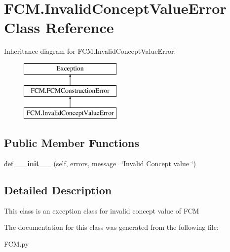 \hypertarget{class_f_c_m_1_1_invalid_concept_value_error}{}\section{F\+C\+M.\+Invalid\+Concept\+Value\+Error Class Reference}
\label{class_f_c_m_1_1_invalid_concept_value_error}
Inheritance diagram for F\+C\+M.\+Invalid\+Concept\+Value\+Error\+:\begin{figure}[H]
\begin{center}
\leavevmode
\includegraphics[height=3.000000cm]{class_f_c_m_1_1_invalid_concept_value_error}
\end{center}
\end{figure}
\subsection*{Public Member Functions}
\begin{DoxyCompactItemize}
\item 
\hypertarget{class_f_c_m_1_1_invalid_concept_value_error_abb1b2a8b8c9d1c8b335e392c228ee805}{}\label{class_f_c_m_1_1_invalid_concept_value_error_abb1b2a8b8c9d1c8b335e392c228ee805} 
def {\bfseries \+\_\+\+\_\+init\+\_\+\+\_\+} (self, errors, message=\char`\"{}Invalid Concept value \char`\"{})
\end{DoxyCompactItemize}


\subsection{Detailed Description}
\begin{DoxyVerb}This class is an exception class for invalid concept value of FCM
\end{DoxyVerb}
 

The documentation for this class was generated from the following file\+:\begin{DoxyCompactItemize}
\item 
F\+C\+M.\+py\end{DoxyCompactItemize}
